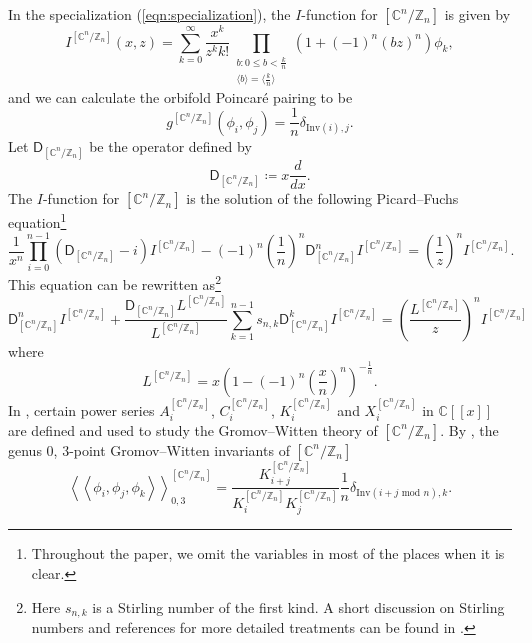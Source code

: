 \documentclass[12pt]{amsart}
\numberwithin{equation}{section}
\newcommand{\CnZn}{[\mathbb{C}^n/\mathbb{Z}_n]}
\begin{document}
 In the specialization (\ref{eqn:specialization}), the $I$-function for  $[\mathbb{C}^n/\mathbb{Z}_n]$ is given by
\begin{equation}\label{def:I-function}
I^{\CnZn}\left(x, z\right)=
        \sum_{k=0}^{\infty}\frac{x^k}{{z^k}k!}\prod_{\substack{b:0\leq b<\frac{k}{n} \\ \langle b \rangle=\langle\frac{k}{n}\rangle}}\left(1+(-1)^n(bz)^n\right)\phi_k,
\end{equation}
and we can calculate the orbifold Poincar\'e pairing to be
\begin{equation}\label{eqn:metric_CnZn}
g^{\CnZn}(\phi_i, \phi_j)=\frac{1}{n}\delta_{\text{Inv}(i),j}.
\end{equation}
Let $\mathsf{D}_{\CnZn}$ be the operator defined by $$\mathsf{D}_{\CnZn}\coloneqq x\frac{d}{dx}.$$
The $I$-function for  $[\mathbb{C}^n/\mathbb{Z}_n]$ is the solution of the following Picard--Fuchs equation\footnote{Throughout the paper, we omit the variables in most of the places when it is clear.}
\begin{equation}\label{eqn:PF_For_CnZn}
\frac{1}{x^n}\prod_{i=0}^{n-1}\left(\mathsf{D}_{\CnZn}-i\right)I^{\CnZn}-(-1)^n\left(\frac{1}{n}\right)^n\mathsf{D}_{\CnZn}^nI^{\CnZn}=\left(\frac{1}{z}\right)^nI^{\CnZn}.
\end{equation}
This equation can be rewritten as\footnote{Here $s_{n,k}$ is a Stirling number of the first kind. A short discussion on Stirling numbers and references for more detailed treatments can be found in \cite{gt}.}
\begin{equation}\label{eqn:PF_for_CnZn}
\mathsf{D}_{\CnZn}^{n}I^{\CnZn}+\frac{\mathsf{D}_{\CnZn} L^{\CnZn}}{L^{\CnZn}} \sum_{k=1}^{n-1} s_{n,k} \mathsf{D}_{\CnZn}^{k}I^{\CnZn}=\left(\frac{L^{\CnZn}}{z}\right)^nI^{\CnZn}
\end{equation}
where
\begin{equation}\label{eqn:Lseries_for_CnZn}
    L^{\CnZn}=x\left(1-(-1)^n\left(\frac{x}{n}\right)^n\right)^{-\frac{1}{n}}.
\end{equation}
In \cite{gt}, certain power series 
$A_i^{\CnZn}$, $C_i^{\CnZn}$, $K_i^{\CnZn}$ and $X_i^{\CnZn}$ in $\mathbb{C}[\![x]\!]$ are defined and used to study the Gromov--Witten theory of $\CnZn$. By \cite[Section 1.4]{gt}, the genus $0$, $3$-point Gromov--Witten invariants of $\CnZn$
\begin{equation}\label{eqn:3pt_inv_CnZn}
\left\langle\left\langle\phi_i,\phi_j,\phi_k\right\rangle\right\rangle_{0,3}^{\left[\mathbb{C}^n/ \mathbb{Z}_n\right]}=\frac{K^{\CnZn}_{i+j}}{K^{\CnZn}_iK^{\CnZn}_j}\frac{1}{n}\delta_{\text{Inv}(i+j \text{ mod }n), k}. \end{equation}
\end{document}
